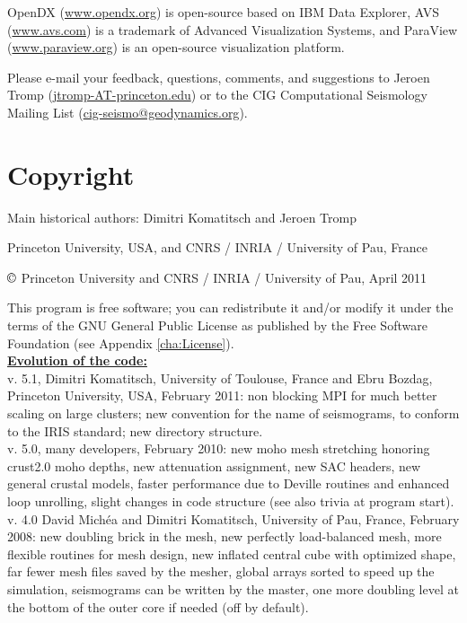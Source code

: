\documentclass[oneside,english]{book}
\newcommand{\urlwithparentheses}[1]{(\url{#1})}
\begin{document}
OpenDX \urlwithparentheses{www.opendx.org} is open-source based on IBM Data Explorer,
AVS \urlwithparentheses{www.avs.com} is a trademark of Advanced Visualization Systems,
and ParaView \urlwithparentheses{www.paraview.org} is an open-source visualization
platform.{\small{} }{\small \par}

Please e-mail your feedback, questions, comments, and suggestions
to Jeroen Tromp \urlwithparentheses{jtromp-AT-princeton.edu} or to the CIG Computational Seismology Mailing List \urlwithparentheses{cig-seismo@geodynamics.org}.


\chapter*{\label{cha:Copyright}Copyright}

Main historical authors: Dimitri Komatitsch and Jeroen Tromp

Princeton University, USA, and CNRS / INRIA / University of Pau, France

$\copyright$ Princeton University and CNRS / INRIA / University of Pau, April 2011

This program is free software; you can redistribute it and/or modify
it under the terms of the GNU General Public License as published
by the Free Software Foundation (see Appendix \ref{cha:License}).\\

\textbf{\underline{Evolution of the code:}}\\

 v. 5.1, Dimitri Komatitsch, University of Toulouse, France and Ebru Bozdag, Princeton University, USA, February 2011:
     non blocking MPI for much better scaling on large clusters;
     new convention for the name of seismograms, to conform to the IRIS standard;
     new directory structure.\\

 v. 5.0, many developers, February 2010:
     new moho mesh stretching honoring crust2.0 moho depths,
     new attenuation assignment, new SAC headers, new general crustal models,
     faster performance due to Deville routines and enhanced loop unrolling,
     slight changes in code structure (see also trivia at program start).\\

 v. 4.0 David Mich\'ea and Dimitri Komatitsch, University of Pau, France, February 2008:
      new doubling brick in the mesh, new perfectly load-balanced mesh,
      more flexible routines for mesh design, new inflated central cube
      with optimized shape, far fewer mesh files saved by the mesher,
      global arrays sorted to speed up the simulation, seismograms can be
      written by the master, one more doubling level at the bottom
      of the outer core if needed (off by default).\\
\end{document}
